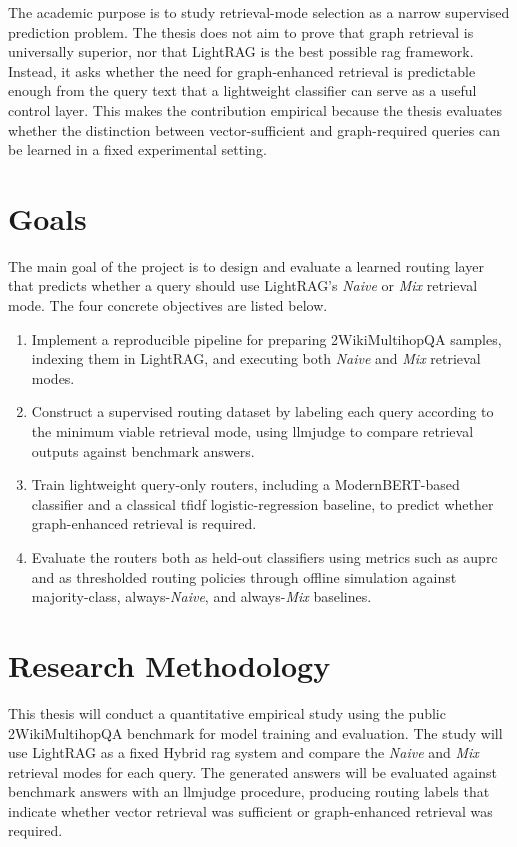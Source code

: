 \documentclass[english, bibtex]{kththesis}               %
\numberwithin{listing}{chapter}
\begin{document}
The academic purpose is to study retrieval-mode selection as a narrow supervised prediction problem. The thesis does not aim to prove that graph retrieval is universally superior, nor that LightRAG is the best possible \gls{rag} framework. Instead, it asks whether the need for graph-enhanced retrieval is predictable enough from the query text that a lightweight classifier can serve as a useful control layer. This makes the contribution empirical because the thesis evaluates whether the distinction between vector-sufficient and graph-required queries can be learned in a fixed experimental setting.



\section{Goals}
\label{sec:goals}
The main goal of the project is to design and evaluate a learned routing layer that predicts whether a query should use LightRAG's \emph{Naive} or \emph{Mix} retrieval mode. The four concrete objectives are listed below.

\begin{enumerate}
\item Implement a reproducible pipeline for preparing 2WikiMultihopQA samples, indexing them in LightRAG, and executing both \emph{Naive} and \emph{Mix} retrieval modes.
\item Construct a supervised routing dataset by labeling each query according to the minimum viable retrieval mode, using \gls{llmjudge} to compare retrieval outputs against benchmark answers.
\item Train lightweight query-only routers, including a ModernBERT-based classifier and a classical \gls{tfidf} logistic-regression baseline, to predict whether graph-enhanced retrieval is required.
\item Evaluate the routers both as held-out classifiers using metrics such as \gls{auprc} and as thresholded routing policies through offline simulation against majority-class, always-\emph{Naive}, and always-\emph{Mix} baselines.
\end{enumerate}

\section{Research Methodology}
\label{sec:researchMethodology}

This thesis will conduct a quantitative empirical study using the public 2WikiMultihopQA benchmark for model training and evaluation. The study will use LightRAG as a fixed Hybrid \gls{rag} system and compare the \emph{Naive} and \emph{Mix} retrieval modes for each query. The generated answers will be evaluated against benchmark answers with an \gls{llmjudge} procedure, producing routing labels that indicate whether vector retrieval was sufficient or graph-enhanced retrieval was required.
\end{document}
